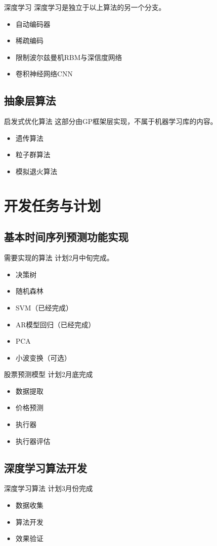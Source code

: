 \documentclass{beamer}
\begin{document}
\begin{frame}{深度学习}
深度学习是独立于以上算法的另一个分支。
\begin{itemize}
\item 自动编码器
\item 稀疏编码
\item 限制波尔兹曼机RBM与深信度网络
\item 卷积神经网络CNN
\end{itemize}
\end{frame}
\subsection{抽象层算法}
\begin{frame}{启发式优化算法}
这部分由GP框架层实现，不属于机器学习库的内容。
\begin{itemize}
\item 遗传算法
\item 粒子群算法
\item 模拟退火算法
\end{itemize}
\end{frame}
\section{开发任务与计划}
\subsection{基本时间序列预测功能实现}
\begin{frame}{需要实现的算法}
计划2月中旬完成。
\begin{itemize}
\item 决策树
\item 随机森林
\item SVM（已经完成）
\item AR模型回归（已经完成）
\item PCA
\item 小波变换（可选）
\end{itemize}
\end{frame}
\begin{frame}{股票预测模型}
计划2月底完成
\begin{itemize}
\item 数据提取
\item 价格预测
\item 执行器
\item 执行器评估
\end{itemize}
\end{frame}
\subsection{深度学习算法开发}
\begin{frame}{深度学习算法}
计划3月份完成
\begin{itemize}
\item 数据收集
\item 算法开发
\item 效果验证
\end{itemize}
\end{frame}
\end{document}
